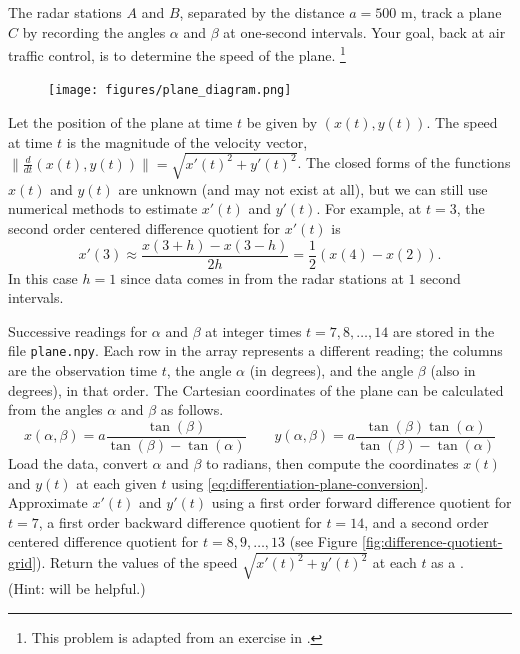\begin{problem}
The radar stations $A$ and $B$, separated by the distance $a = 500$ m, track a plane $C$ by recording the angles $\alpha$ and $\beta$ at one-second intervals.
Your goal, back at air traffic control, is to determine the speed of the plane.%
\footnote{This problem is adapted from an exercise in \cite{kiusalaas2013numerical}.}
%
\begin{figure}[H]
    \texttt{[image: figures/plane\_diagram.png]}
\end{figure}
%
Let the position of the plane at time $t$ be given by $(x(t),y(t))$.
The speed at time $t$ is the magnitude of the velocity vector, $\|\frac{d}{dt}(x(t),y(t))\| = \sqrt{x'(t)^2 + y'(t)^2}$.
The closed forms of the functions $x(t)$ and $y(t)$ are unknown (and may not exist at all), but we can still use numerical methods to estimate $x'(t)$ and $y'(t)$.
For example, at $t=3$, the second order centered difference quotient for $x'(t)$ is
\[
x'(3) \approx \frac{x(3+h) - x(3-h)}{2h} = \frac{1}{2}(x(4) - x(2)).
\]
In this case $h=1$ since data comes in from the radar stations at $1$ second intervals.

Successive readings for $\alpha$ and $\beta$ at integer times $t=7,8,\ldots,14$ are stored in the file \texttt{plane.npy}.
Each row in the array represents a different reading; the columns are the observation time $t$, the angle $\alpha$ (in degrees), and the angle $\beta$ (also in degrees), in that order.
The Cartesian coordinates of the plane can be calculated from the angles $\alpha$ and $\beta$ as follows.
\begin{equation}
\label{eq:differentiation-plane-conversion}
x(\alpha, \beta) = a \frac{\tan(\beta)}{\tan(\beta)-\tan(\alpha)}
\qquad
y(\alpha, \beta) = a \frac{\tan(\beta)\tan(\alpha)}{\tan(\beta)-\tan(\alpha)}
\end{equation}
Load the data, convert $\alpha$ and $\beta$ to radians, then compute the coordinates $x(t)$ and $y(t)$ at each given $t$ using \ref{eq:differentiation-plane-conversion}.
Approximate $x'(t)$ and $y'(t)$ using a first order forward difference quotient for $t=7$, a first order backward difference quotient for $t=14$, and a second order centered difference quotient for $t=8,9,\ldots,13$ (see Figure \ref{fig:difference-quotient-grid}).
Return the values of the speed $\sqrt{x'(t)^2+y'(t)^2}$ at each $t$ as a .
\\(Hint:  will be helpful.)
\end{problem}

